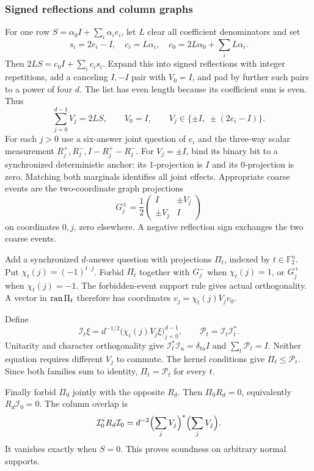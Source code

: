 \subsubsection{Signed reflections and column graphs}
For one row $S=\alpha_0I+\sum_i\alpha_ie_i$, let $L$ clear all coefficient denominators and set
\[
 s_i=2e_i-I,\quad c_i=L\alpha_i,\quad
 c_0=2L\alpha_0+\sum_iL\alpha_i.
\]
Then $2LS=c_0I+\sum_ic_is_i$. Expand this into signed reflections with integer repetitions, add a canceling $I,-I$ pair with $V_0=I$, and pad by further such pairs to a power of four $d$. The list has even length because its coefficient sum is even. Thus
\begin{equation}\label{eq:slots}
 \sum_{j=0}^{d-1}V_j=2LS,\qquad V_0=I,\qquad
 V_j\in\{\pm I,\ \pm(2e_i-I)\}.
\end{equation}
For each $j>0$ use a six-answer joint question of $e_i$ and the three-way scalar measurement $R_j^+,R_j^-,I-R_j^+-R_j^-$. For $V_j=\pm I$, bind its binary bit to a synchronized deterministic anchor: its $1$-projection is $I$ and its $0$-projection is zero. Matching both marginals identifies all joint effects. Appropriate coarse events are the two-coordinate graph projections
\[
 G_j^\pm=\frac12\begin{pmatrix}I&\pm V_j\\\pm V_j&I\end{pmatrix}
\]
on coordinates $0,j$, zero elsewhere. A negative reflection sign exchanges the two coarse events.

Add a synchronized $d$-answer question with projections $\Pi_t$, indexed by $t\in\mathbb F_2^n$. Put $\chi_t(j)=(-1)^{t\cdot j}$. Forbid $\Pi_t$ together with $G_j^-$ when $\chi_t(j)=1$, or $G_j^+$ when $\chi_t(j)=-1$. The forbidden-event support rule gives actual orthogonality. A vector in $\operatorname{ran} \Pi_t$ therefore has coordinates $v_j=\chi_t(j)V_jv_0$.

Define
\[
 \mathcal I_t\xi=d^{-1/2}\bigl(\chi_t(j)V_j\xi\bigr)_{j=0}^{d-1},
 \qquad \mathcal P_t=\mathcal I_t\mathcal I_t^*.
\]
Unitarity and character orthogonality give $\mathcal I_t^*\mathcal I_u=\delta_{tu}I$ and $\sum_t\mathcal P_t=I$. Neither equation requires different $V_j$ to commute. The kernel conditions give $\Pi_t\leq \mathcal P_t$. Since both families sum to identity, $\Pi_t=\mathcal P_t$ for every $t$.

Finally forbid $\Pi_0$ jointly with the opposite $R_d$. Then $\Pi_0R_d=0$, equivalently $R_d\mathcal I_0=0$. The column overlap is
\[
 \mathcal I_0^*R_d\mathcal I_0=d^{-2}\Bigl(\sum_jV_j\Bigr)^*
                                  \Bigl(\sum_jV_j\Bigr).
\]
It vanishes exactly when $S=0$. This proves soundness on arbitrary normal supports.

